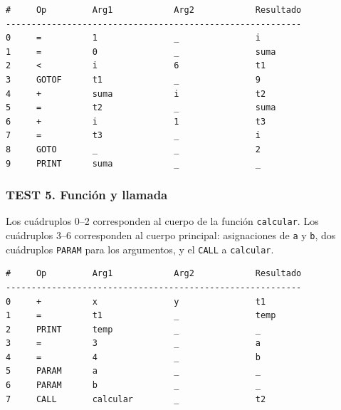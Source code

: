 \documentclass[12pt, letterpaper]{article}
\theoremstyle{definition}
\begin{document}
\begin{verbatim}
#     Op         Arg1            Arg2            Resultado
----------------------------------------------------------
0     =          1               _               i
1     =          0               _               suma
2     <          i               6               t1
3     GOTOF      t1              _               9
4     +          suma            i               t2
5     =          t2              _               suma
6     +          i               1               t3
7     =          t3              _               i
8     GOTO       _               _               2
9     PRINT      suma            _               _
\end{verbatim}

\subsubsection*{TEST 5. Función y llamada}

Los cuádruplos 0--2 corresponden al cuerpo de la función \texttt{calcular}.  Los cuádruplos 3--6 corresponden al cuerpo principal: asignaciones de \texttt{a} y \texttt{b}, dos cuádruplos \texttt{PARAM} para los argumentos, y el \texttt{CALL} a \texttt{calcular}.

\begin{verbatim}
#     Op         Arg1            Arg2            Resultado
----------------------------------------------------------
0     +          x               y               t1
1     =          t1              _               temp
2     PRINT      temp            _               _
3     =          3               _               a
4     =          4               _               b
5     PARAM      a               _               _
6     PARAM      b               _               _
7     CALL       calcular        _               t2
\end{verbatim}
\end{document}
